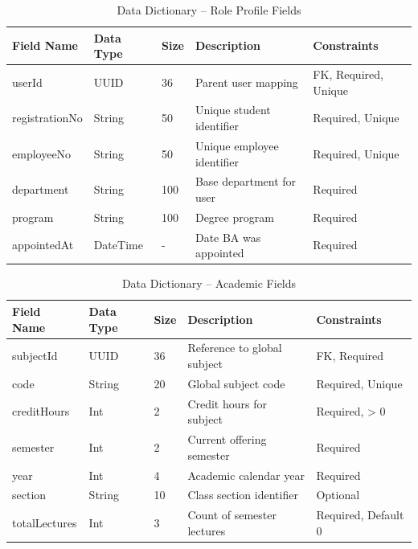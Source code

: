 \begin{table}[H]
\centering
\caption{Data Dictionary – Role Profile Fields}
\begin{tabularx}{\textwidth}{|p{2.5cm}|p{2cm}|p{1.2cm}|X|p{3cm}|}
\hline
\textbf{Field Name} & \textbf{Data Type} & \textbf{Size} & \textbf{Description} & \textbf{Constraints} \\
\hline
userId & UUID & 36 & Parent user mapping & FK, Required, Unique \\
\hline
registrationNo & String & 50 & Unique student identifier & Required, Unique \\
\hline
employeeNo & String & 50 & Unique employee identifier & Required, Unique \\
\hline
department & String & 100 & Base department for user & Required \\
\hline
program & String & 100 & Degree program & Required \\
\hline
appointedAt & DateTime & - & Date BA was appointed & Required \\
\hline
\end{tabularx}
\end{table}

\begin{table}[H]
\centering
\caption{Data Dictionary – Academic Fields}
\begin{tabularx}{\textwidth}{|p{2.5cm}|p{2cm}|p{1.2cm}|X|p{3cm}|}
\hline
\textbf{Field Name} & \textbf{Data Type} & \textbf{Size} & \textbf{Description} & \textbf{Constraints} \\
\hline
subjectId & UUID & 36 & Reference to global subject & FK, Required \\
\hline
code & String & 20 & Global subject code & Required, Unique \\
\hline
creditHours & Int & 2 & Credit hours for subject & Required, > 0 \\
\hline
semester & Int & 2 & Current offering semester & Required \\
\hline
year & Int & 4 & Academic calendar year & Required \\
\hline
section & String & 10 & Class section identifier & Optional \\
\hline
totalLectures & Int & 3 & Count of semester lectures & Required, Default 0 \\
\hline
\end{tabularx}
\end{table}

